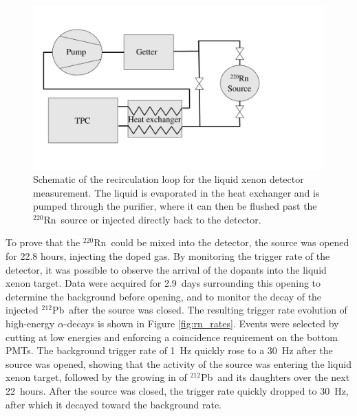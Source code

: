 \begin{figure}[htb]
\centering
    \includegraphics[trim = 0 0 0 0, clip = true,width = 0.8\columnwidth]{figures/rnsource/recirc_schematic}
    \caption{Schematic of the recirculation loop for the liquid xenon detector measurement. The liquid is evaporated in the heat exchanger and is pumped through the purifier, where it can then be flushed past the $^{220}$Rn~source or injected directly back to the detector.}\label{fig:rn_recirc}
\end{figure}

To prove that the $^{220}$Rn~could be mixed into the detector, the source was opened for 22.8 hours, injecting the doped gas. By monitoring the trigger rate of the detector, it was possible to observe the arrival of the dopants into the liquid xenon target. Data were acquired for 2.9~days surrounding this opening to determine the background before opening, and to monitor the decay of the injected $^{212}$Pb~after the source was closed. The resulting trigger rate evolution of high-energy $\alpha$-decays is shown in Figure \ref{fig:rn_rates}. Events were selected by cutting at low energies and enforcing a coincidence requirement on the bottom PMTs. The background trigger rate of 1~Hz quickly rose to a 30~Hz after the source was opened, showing that the activity of the source was entering the liquid xenon target, followed by the growing in of $^{212}$Pb~and its daughters over the next 22~hours. After the source was closed, the trigger rate quickly dropped to 30~Hz, after which it decayed toward the background rate.

